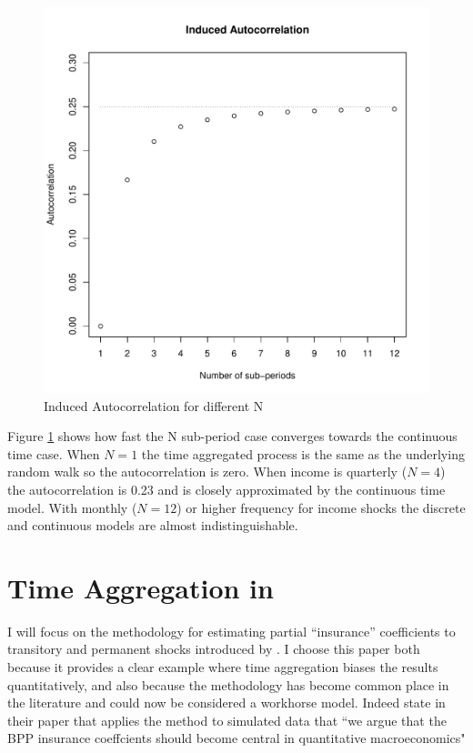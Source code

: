 \begin{figure}
	\caption{Induced Autocorrelation for different N}
	\label{fig:InducedAutocorrelation}
	\includegraphics[width=1\textwidth]{./Chapter1/Figures/InducedAutocorrelation.pdf}
\end{figure}
Figure \ref{fig:InducedAutocorrelation} shows how fast the N sub-period case converges towards the continuous time case. When $N=1$ the time aggregated process is the same as the underlying random walk so the autocorrelation is zero. When income is quarterly ($N=4$) the autocorrelation is 0.23 and is closely approximated by the continuous time model. With monthly ($N=12$) or higher frequency for income shocks the discrete and continuous models are almost indistinguishable. 

\section{Time Aggregation in \cite{blundell_consumption_2008}} \label{BPP}
I will focus on the methodology for estimating partial ``insurance'' coefficients to transitory and permanent shocks introduced by \cite{blundell_consumption_2008}. I choose this paper both because it provides a clear example where time aggregation biases the results quantitatively, and also because the methodology has become common place in the literature and could now be considered a workhorse model. Indeed \cite{kaplan_how_2010} state in their paper that applies the method to simulated data that ``we argue that the BPP insurance coeffcients should become central in quantitative
macroeconomics"

